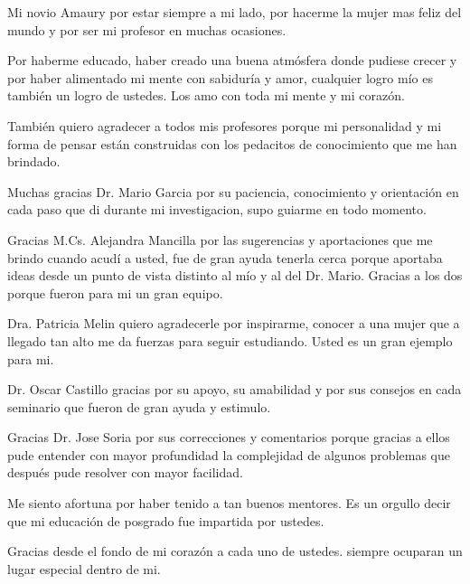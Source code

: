 Mi novio Amaury por estar siempre a mi lado, por hacerme la mujer mas feliz del mundo y por ser mi profesor en muchas ocasiones.

Por haberme educado, haber creado una buena atmósfera donde pudiese crecer y por haber alimentado mi mente con sabiduría y amor, cualquier logro mío es también un logro de ustedes. Los amo con toda mi mente y mi corazón.

También quiero agradecer a todos mis profesores porque mi personalidad y mi forma de pensar están construidas con los pedacitos de conocimiento que me han brindado.

Muchas gracias Dr. Mario Garcia por su paciencia, conocimiento y orientación en cada paso que di durante mi investigacion, supo guiarme en todo momento.

Gracias M.Cs. Alejandra Mancilla por las sugerencias y aportaciones que me brindo cuando acudí a usted, fue de gran ayuda tenerla cerca porque aportaba ideas desde un punto de vista distinto al mío y al del Dr. Mario. Gracias a los dos porque fueron para mi un gran equipo.

Dra. Patricia Melin quiero agradecerle por inspirarme, conocer a una mujer que a llegado tan alto me da fuerzas para seguir estudiando. Usted es un gran ejemplo para mi.

Dr. Oscar Castillo gracias por su apoyo, su amabilidad y por sus consejos en cada seminario que fueron de gran ayuda y estimulo.

Gracias Dr. Jose Soria por sus correcciones y comentarios porque gracias a ellos pude entender con mayor profundidad la complejidad de algunos problemas que después pude resolver con mayor facilidad.

Me siento afortuna por haber tenido a tan buenos mentores. Es un orgullo decir que mi educación de posgrado fue impartida por ustedes.

Gracias desde el fondo de mi corazón a cada uno de ustedes. siempre ocuparan un lugar especial dentro de mi.


